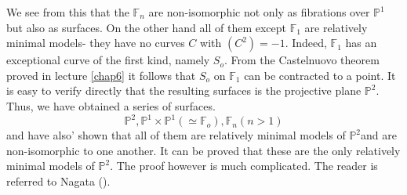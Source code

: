  We see from this that the $\mathbb{F}_n$ are non-isomorphic not only
 as fibrations over $\mathbb{P}^1$ but also as surfaces. On the other
 hand all of them except $\mathbb{F}_1$ are relatively minimal models-
 they have no curves $C$ with $(C^2)=-1$. Indeed, $\mathbb{F}_1$ has
 an exceptional curve of the first kind, namely $S_o$. From the
 Castelnuovo theorem proved in lecture \ref{chap6} it follows that $S_o$ on
 $\mathbb{F}_1$ can be contracted to a point. It is easy to verify
 directly that the resulting surfaces is the projective plane
 $\mathbb{P}^2$. Thus, we have obtained a series of surfaces.   
  $$
 \mathbb{P}^2 ,\mathbb{P}^1 \times \mathbb{P}^1 (\simeq
 \mathbb{F}_o),\mathbb{F}_n (n >1) 
 $$   
 and have also' shown that all of them are relatively minimal models
 of $\mathbb{P}^2$\pageoriginale and are non-isomorphic to one
 another. It can be proved that these are the only relatively minimal
 models of $\mathbb{P}^2$. The proof however is much complicated. The
 reader is referred to Nagata (\cite{key18}).  
